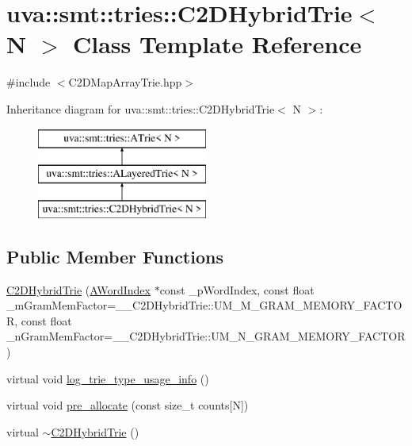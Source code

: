 \hypertarget{classuva_1_1smt_1_1tries_1_1_c2_d_hybrid_trie}{}\section{uva\+:\+:smt\+:\+:tries\+:\+:C2\+D\+Hybrid\+Trie$<$ N $>$ Class Template Reference}
\label{classuva_1_1smt_1_1tries_1_1_c2_d_hybrid_trie}


{\ttfamily \#include $<$C2\+D\+Map\+Array\+Trie.\+hpp$>$}

Inheritance diagram for uva\+:\+:smt\+:\+:tries\+:\+:C2\+D\+Hybrid\+Trie$<$ N $>$\+:\begin{figure}[H]
\begin{center}
\leavevmode
\includegraphics[height=3.000000cm]{classuva_1_1smt_1_1tries_1_1_c2_d_hybrid_trie}
\end{center}
\end{figure}
\subsection*{Public Member Functions}
\begin{DoxyCompactItemize}
\item 
\hyperlink{classuva_1_1smt_1_1tries_1_1_c2_d_hybrid_trie_ae2d72a68e98e8c703e4a4b745852b231}{C2\+D\+Hybrid\+Trie} (\hyperlink{classuva_1_1smt_1_1tries_1_1dictionary_1_1_a_word_index}{A\+Word\+Index} $\ast$const \+\_\+p\+Word\+Index, const float \+\_\+m\+Gram\+Mem\+Factor=\+\_\+\+\_\+\+C2\+D\+Hybrid\+Trie\+::\+U\+M\+\_\+\+M\+\_\+\+G\+R\+A\+M\+\_\+\+M\+E\+M\+O\+R\+Y\+\_\+\+F\+A\+C\+T\+O\+R, const float \+\_\+n\+Gram\+Mem\+Factor=\+\_\+\+\_\+\+C2\+D\+Hybrid\+Trie\+::\+U\+M\+\_\+\+N\+\_\+\+G\+R\+A\+M\+\_\+\+M\+E\+M\+O\+R\+Y\+\_\+\+F\+A\+C\+T\+O\+R)
\item 
virtual void \hyperlink{classuva_1_1smt_1_1tries_1_1_c2_d_hybrid_trie_aef676e4ee209417b74ee1a2965b99bb6}{log\+\_\+trie\+\_\+type\+\_\+usage\+\_\+info} ()
\item 
virtual void \hyperlink{classuva_1_1smt_1_1tries_1_1_c2_d_hybrid_trie_a2170d7a064d7a565037e8f48e2742986}{pre\+\_\+allocate} (const size\+\_\+t counts\mbox{[}N\mbox{]})
\item 
virtual \hyperlink{classuva_1_1smt_1_1tries_1_1_c2_d_hybrid_trie_a5c0a7baeb0cf37e47714b2c3ccb5a620}{$\sim$\+C2\+D\+Hybrid\+Trie} ()
\end{DoxyCompactItemize}
